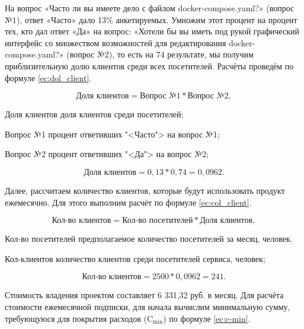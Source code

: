 На вопрос «Часто ли вы имеете дело с файлом docker-compose.yaml?»
(вопрос №1), ответ «Часто» дало 13\% анкетируемых. Умножим этот процент
на процент тех, кто дал ответ «Да» на вопрос: «Хотели бы вы иметь под
рукой графический интерфейс со множеством возможностей для
редактирования docker-compose.yaml?» (вопрос №2), то есть на 74%
результате, мы получим приблизительную долю клиентов среди всех
посетителей. Расчёты проведём по формуле \ref{ec:dol_client}.

\begin{equation}
    \label{ec:dol_client}
    \text{Доля клиентов} = \text{Вопрос №1} * \text{Вопрос №2},
\end{equation}

\begin{eqexpl}[15ex]
    \item{Доля клиентов} доля клиентов среди посетителей;
    \item{Вопрос №1} процент ответивших "<Часто"> на вопрос №1;
    \item{Вопрос №2} процент ответивших "<Да"> на вопрос №2; 
\end{eqexpl}

\begin{equation*}
    \text{Доля клиентов} = 0,13 * 0,74 = 0,0962.
\end{equation*}

Далее, рассчитаем количество клиентов, которые будут использовать
продукт ежемесячно. Для этого выполним расчёт по формуле \ref{ec:col_client}.

\begin{equation}
    \label{ec:col_client}
    \text{Кол-во клиентов} = \text{Кол-во посетителей} * \text{Доля клиентов},
\end{equation}

\begin{eqexpl}[19ex]
    \item{Кол-во посетителей}  предполагаемое количество посетителей за
    месяц, человек.
    \item{Кол-клиентов} количество клиентов среди посетителей сервиса,
    человек;
\end{eqexpl}

\begin{equation*}
    \text{Кол-во клиентов} = 2 500 * 0,0962 = 241.
\end{equation*}

Стоимость владения проектом составляет 6 331,32 руб. в месяц. Для
расчёта стоимости ежемесячной подписки, для начала вычислим
минимальную сумму, требующуюся для покрытия расходов ($\text{C}_\text{min}$) по
формуле \ref{ec:c-min}.

